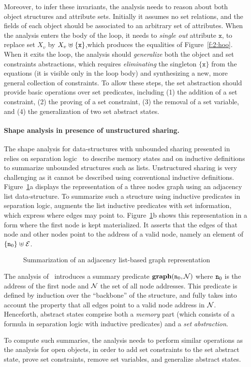 Moreover, to infer these invariants, the analysis needs to reason
about both object structures and attribute sets.
Initially it assumes no set relations, and the fields of
each object should be associated to an arbitrary set of attributes.
When the analysis enters the body of the loop, it needs to
{\em single out} attribute \( \mathtt{x} \), \ie to replace set
\( X_v \) by \( X_v \mathrel{\uplus} \{ \mathtt{x} \} \),which produces the
equalities of Figure~\ref{f:2:hoo}.
When it exits the loop, the analysis should {\em generalize}
both the object and set constraints abstractions, which requires
{\em eliminating} the singleton \( \{ \mathtt{x} \} \) from the
equations (it is visible only in the loop body) and synthesizing
a new, more general collection of constraints.
To allow these steps, the set abstraction should provide basic operations
over set predicates, including (1) the addition of a set constraint, (2)
the proving of a set constraint, (3) the removal of a set variable, and
(4) the generalization of two set abstract states.

\paragraph{Shape analysis in presence of unstructured sharing.}
The shape analysis for data-structures with unbounded sharing presented
in~\cite{memcad:15:sas} relies on separation logic~\cite{r:lics:02} to
describe memory states and on inductive definitions to summarize
unbounded structures such as lists.
Unstructured sharing is very challenging as it cannot be described using
conventional inductive definitions.
Figure~\ref{f:3:memcad}a displays the representation of a three nodes
graph using an adjacency list data-structure.
To summarize such a structure using inductive predicates in separation
logic, \cite{memcad:15:sas} augments the list inductive
predicates with set information, which express where edges may point to.
Figure~\ref{f:3:memcad}b shows this representation in
a form where the first node is kept materialized.
It asserts that the edges of that node and other nodes
point to the address of a valid node, namely an element of \( \{ \texttt{n}_{0}
\} \mathrel{\uplus} \mathcal{E} \).
\begin{figure}[t]
  \newcommand{\picscale}{0.9}
  \begin{center}
    \tikzpics{\picscale}{memcad-inv}
  \end{center}
  \caption{Summarization of an adjacency list-based graph representation}
  \label{f:3:memcad}
\end{figure}
The analysis of~\cite{memcad:15:sas} introduces a summary predicate
\( \textbf{graph}( \texttt{n}_{0}, \mathcal{N} ) \) where \( \texttt{n}_{0} \) is the
address of the first node and \( \mathcal{N} \) the set of all node addresses.
This predicate is defined by induction over the ``backbone'' of the
structure, and fully takes into account the property that all edges
point to a valid node address in \( \mathcal{N} \).
Henceforth, abstract states comprise both a {\em memory} part (which
consists of a formula in separation logic with inductive predicates)
and a {\em set abstraction}.

To compute such summaries, the analysis needs to perform similar
operations as the analysis for open objects, in order to add set
constraints to the set abstract state, prove set constraints,
remove set variables, and generalize abstract states.
